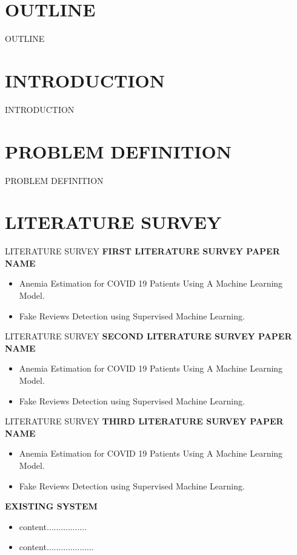\documentclass[svgnames,9pt]{beamer}
\begin{document}
\section{OUTLINE}
\begin{frame}{OUTLINE}
	\tableofcontents
\end{frame}
\section{INTRODUCTION}
\begin{frame}{INTRODUCTION}
\end{frame}

\section{PROBLEM DEFINITION}
\begin{frame}{PROBLEM DEFINITION}
\end{frame}

\section{LITERATURE SURVEY}
\begin{frame}{LITERATURE SURVEY}
\textbf{FIRST LITERATURE SURVEY PAPER NAME }
\begin{itemize}
\item  Anemia Estimation for COVID 19 Patients Using A Machine Learning Model.
\item Fake Reviews Detection using Supervised Machine Learning.
\end{itemize}
\end{frame}
\begin{frame}{LITERATURE SURVEY}
\textbf{SECOND LITERATURE SURVEY PAPER NAME }
\begin{itemize}
\item  Anemia Estimation for COVID 19 Patients Using A Machine Learning Model.
\item Fake Reviews Detection using Supervised Machine Learning.
\end{itemize}
\end{frame}
\begin{frame}{LITERATURE SURVEY}
\textbf{THIRD LITERATURE SURVEY PAPER NAME }
\begin{itemize}
\item  Anemia Estimation for COVID 19 Patients Using A Machine Learning Model.
\item Fake Reviews Detection using Supervised Machine Learning.
\end{itemize}

\textbf{EXISTING SYSTEM}
\begin{itemize}
\item  content.................
\item content....................
\end{itemize}
\end{frame}
\end{document}
